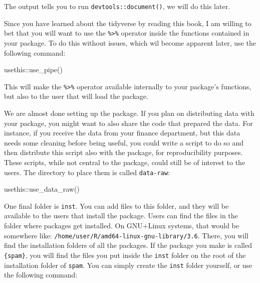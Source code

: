 \documentclass[
]{article}
\newenvironment{Shaded}{\begin{snugshade}}{\end{snugshade}}
\newcommand{\FunctionTok}[1]{\textcolor[rgb]{0.00,0.00,0.00}{#1}}
\newcommand{\NormalTok}[1]{#1}
\newcommand{\SpecialCharTok}[1]{\textcolor[rgb]{0.00,0.00,0.00}{#1}}
\begin{document}
The output tells you to run \texttt{devtools::document()}, we will do this later.

Since you have learned about the tidyverse by reading this book, I am willing to bet that you will
want to use the \texttt{\%\textgreater{}\%} operator inside the functions contained in your package. To do this without issues,
which wil become apparent later, use the following command:

\begin{Shaded}
\begin{Highlighting}[]
\NormalTok{usethis}\SpecialCharTok{::}\FunctionTok{use\_pipe}\NormalTok{()}
\end{Highlighting}
\end{Shaded}

This will make the \texttt{\%\textgreater{}\%} operator available internally to your package's functions, but also to the
user that will load the package.

We are almost done setting up the package. If you plan on distributing data with your package,
you might want to also share the code that prepared the data. For instance, if you receive the
data from your finance department, but this data needs some cleaning before being useful, you could
write a script to do so and then distribute this script also with the package, for reproducibility
purposes. These scripts, while not central to the package, could still be of interest to the users.
The directory to place them is called \texttt{data-raw}:

\begin{Shaded}
\begin{Highlighting}[]
\NormalTok{usethis}\SpecialCharTok{::}\FunctionTok{use\_data\_raw}\NormalTok{()}
\end{Highlighting}
\end{Shaded}

One final folder is \texttt{inst}. You can add files to this folder, and they will be available to the users
that install the package. Users can find the files in the folder where packages get installed. On
GNU+Linux systems, that would be somewhere like: \texttt{/home/user/R/amd64-linux-gnu-library/3.6}. There,
you will find the installation folders of all the packages. If the package you make is called \texttt{\{spam\}},
you will find the files you put inside the \texttt{inst} folder on the root of the installation folder of
\texttt{spam}. You can simply create the \texttt{inst} folder yourself, or use the following command:
\end{document}
